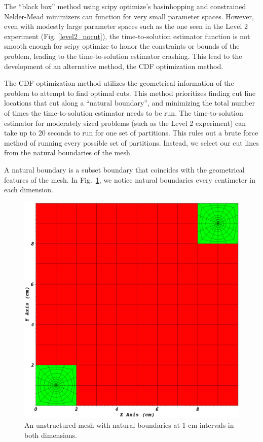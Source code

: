 The ``black box'' method using scipy optimize's basinhopping and constrained Nelder-Mead minimizers can function for very small parameter spaces.
However, even with modestly large parameter spaces such as the one seen in the Level 2 experiment (Fig. \ref{level2_nocut}), the time-to-solution estimator function is not smooth enough for scipy optimize to honor the constraints or bounds of the problem, leading to the time-to-solution estimator crashing.
This lead to the development of an alternative method, the CDF optimization method.

The CDF optimization method utilizes the geometrical information of the problem to attempt to find optimal cuts. This method prioritizes finding cut line locations that cut along a ``natural boundary'', and minimizing the total number of times the time-to-solution estimator needs to be run.
The time-to-solution estimator for moderately sized problems (such as the Level 2 experiment) can take up to 20 seconds to run for one set of partitions.
This rules out a brute force method of running every possible set of partitions.
Instead, we select our cut lines from the natural boundaries of the mesh.

A natural boundary is a subset boundary that coincides with the geometrical features of the mesh. In Fig.~\ref{natural_boundary_example}, we notice natural boundaries every centimeter in each dimension.
 \begin{figure}[h]
\centering
\includegraphics[scale=0.2]{../figures/spiderweb_10x10_sparse.png}
\caption{An unstructured mesh with natural boundaries at 1 cm intervals in both dimensions.}
\label{natural_boundary_example}
\end{figure}

